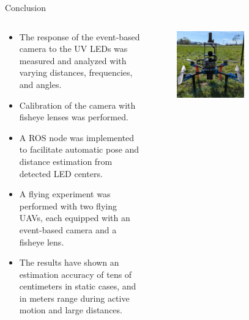 \documentclass{beamer}
\begin{document}
\begin{frame}{Conclusion}

\begin{columns}[T]
    \begin{column}{0.49\textwidth}
        \vspace{0.5cm}
        \scriptsize{
            \begin{itemize}
                \item The response of the event-based camera to the UV LEDs was measured and analyzed with varying distances, frequencies, and angles.
                \item Calibration of the camera with fisheye lenses was performed.
                \item A ROS node was implemented to facilitate automatic pose and distance estimation from detected LED centers.
                \item A flying experiment was performed with two flying UAVs, each equipped with an event-based camera and a fisheye lens.
                \item The results have shown an estimation accuracy of tens of centimeters in static cases, and in meters range during active motion and large distances.
            \end{itemize}
        }
    \end{column}

    \begin{column}{0.49\textwidth}
        \vspace{-0.1cm}
        \begin{figure}
            \centering
            \includegraphics[width=0.60\textwidth]{./fig/photos/uav33.jpg}
            
            \vspace{0.1cm}
            

\end{figure}
\end{column}
\end{columns}
\end{frame}
\end{document}

